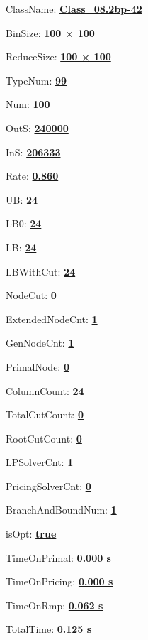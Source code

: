 \documentclass[11pt]{article}
\begin{document}
\pagestyle{empty}


ClassName: \underline{\textbf{Class_08.2bp-42}}
\par
BinSize: \underline{\textbf{100 × 100}}
\par
ReduceSize: \underline{\textbf{100 × 100}}
\par
TypeNum: \underline{\textbf{99}}
\par
Num: \underline{\textbf{100}}
\par
OutS: \underline{\textbf{240000}}
\par
InS: \underline{\textbf{206333}}
\par
Rate: \underline{\textbf{0.860}}
\par
UB: \underline{\textbf{24}}
\par
LB0: \underline{\textbf{24}}
\par
LB: \underline{\textbf{24}}
\par
LBWithCut: \underline{\textbf{24}}
\par
NodeCut: \underline{\textbf{0}}
\par
ExtendedNodeCnt: \underline{\textbf{1}}
\par
GenNodeCnt: \underline{\textbf{1}}
\par
PrimalNode: \underline{\textbf{0}}
\par
ColumnCount: \underline{\textbf{24}}
\par
TotalCutCount: \underline{\textbf{0}}
\par
RootCutCount: \underline{\textbf{0}}
\par
LPSolverCnt: \underline{\textbf{1}}
\par
PricingSolverCnt: \underline{\textbf{0}}
\par
BranchAndBoundNum: \underline{\textbf{1}}
\par
isOpt: \underline{\textbf{true}}
\par
TimeOnPrimal: \underline{\textbf{0.000 s}}
\par
TimeOnPricing: \underline{\textbf{0.000 s}}
\par
TimeOnRmp: \underline{\textbf{0.062 s}}
\par
TotalTime: \underline{\textbf{0.125 s}}
\par
\newpage


\end{document}
